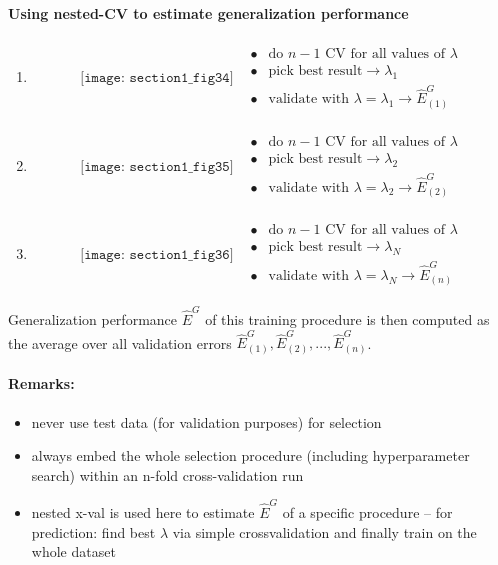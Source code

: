 \paragraph{Using nested-CV to estimate generalization performance}
\begin{enumerate}[(1)]
\item \[ \begin{array}{ll}
	\texttt{[image: section1\_fig34]}
	& \begin{array}{ll}
		\bullet & \text{do } n - 1 \text{ CV for all 
			values of } \lambda \\
		\bullet & \text{pick best result} \rightarrow \lambda_1 \\
		\bullet & \text{validate with } \lambda=\lambda_1 \rightarrow \hat{E}^G_{(1)}
	\end{array}
\end{array} \]
\item \[ \begin{array}{ll}
	\texttt{[image: section1\_fig35]}
	& \begin{array}{ll}
		\bullet & \text{do } n - 1 \text{ CV for all 
			values of } \lambda \\
		\bullet & \text{pick best result} \rightarrow \lambda_2\\
		\bullet & \text{validate with } \lambda=\lambda_2 \rightarrow \hat{E}^G_{(2)}
	\end{array}
\end{array} \]
\item \[ \begin{array}{ll}
	\texttt{[image: section1\_fig36]}
	& \begin{array}{ll}
		\bullet & \text{do } n - 1 \text{ CV for all 
			values of } \lambda \\
		\bullet & \text{pick best result} \rightarrow \lambda_N\\
		\bullet & \text{validate with } \lambda=\lambda_N \rightarrow \hat{E}^G_{(n)}
	\end{array}
\end{array} \]
\end{enumerate}
Generalization performance $\widehat{E}^G$ of this training
procedure is then computed as the average over all
validation errors $\hat{E}^G_{(1)}, \hat{E}^G_{(2)}, ...,
\hat{E}^G_{(n)}$. 
\paragraph{Remarks:}
\begin{itemize}
\item never use test data (for validation purposes) for selection
\item always embed the whole selection procedure (including 
  hyperparameter search) within an n-fold cross-validation run
\item nested x-val is used here to estimate $\hat{E}^G$ of a specific procedure -- for prediction: find best $\lambda$ via simple crossvalidation
  and finally train on the whole dataset
\end{itemize}


